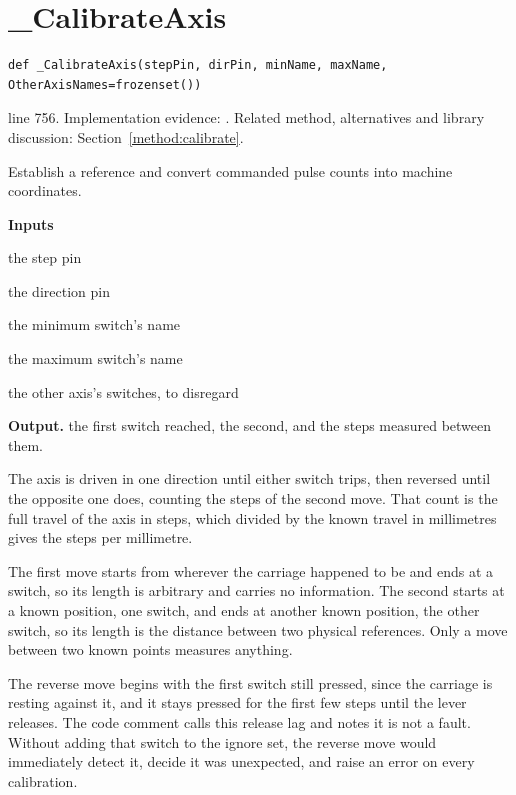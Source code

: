 \section{\_CalibrateAxis}\label{fn:reproduce:-CalibrateAxis}
\begin{lstlisting}[style=sig]
def _CalibrateAxis(stepPin, dirPin, minName, maxName, OtherAxisNames=frozenset())
\end{lstlisting}
 line 756. Implementation evidence: \cite{code2026}. Related method, alternatives and library discussion: Section~\ref{method:calibrate}.


Establish a reference and convert commanded pulse counts into machine coordinates.




\noindent\textbf{Inputs}
\begin{description}[leftmargin=2.2em,style=nextline,font=\normalfont\ttfamily]\setlength\itemsep{1pt}
  \item[{stepPin}] \normalfont the step pin
  \item[{dirPin}] \normalfont the direction pin
  \item[{minName}] \normalfont the minimum switch's name
  \item[{maxName}] \normalfont the maximum switch's name
  \item[{OtherAxisNames}] \normalfont the other axis's switches, to disregard
\end{description}

\noindent\textbf{Output.} the first switch reached, the second, and the steps measured between them.


The axis is driven in one direction until either switch trips, then reversed until the opposite one does, counting the steps of the second move. That count is the full travel of the axis in steps, which divided by the known travel in millimetres gives the steps per millimetre.


The first move starts from wherever the carriage happened to be and ends at a switch, so its length is arbitrary and carries no information. The second starts at a known position, one switch, and ends at another known position, the other switch, so its length is the distance between two physical references. Only a move between two known points measures anything.


The reverse move begins with the first switch still pressed, since the carriage is resting against it, and it stays pressed for the first few steps until the lever releases. The code comment calls this release lag and notes it is not a fault. Without adding that switch to the ignore set, the reverse move would immediately detect it, decide it was unexpected, and raise an error on every calibration.


